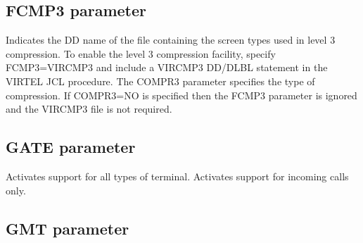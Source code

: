 \documentclass[letterpaper,10pt,english]{sphinxmanual}
\begin{document}
\ignorespaces 

\subsection{FCMP3 parameter}
\label{\detokenize{Installation_Guide:fcmp3-parameter}}\label{\detokenize{Installation_Guide:index-66}}
\begin{sphinxVerbatim}[commandchars=\\\{\}]
 
\end{sphinxVerbatim}

\sphinxAtStartPar
{} \sphinxhyphen{} Indicates the DD name of the file containing the screen types used in level 3 compression. To enable the level 3 compression facility, specify FCMP3=VIRCMP3 and include a VIRCMP3 DD/DLBL statement in the VIRTEL JCL procedure. The COMPR3 parameter specifies the type of compression. If COMPR3=NO is specified then the FCMP3 parameter is ignored and the VIRCMP3 file is not required.

\ignorespaces 

\subsection{GATE parameter}
\label{\detokenize{Installation_Guide:gate-parameter}}\label{\detokenize{Installation_Guide:index-67}}
\begin{sphinxVerbatim}[commandchars=\\\{\}]
 
\end{sphinxVerbatim}

\sphinxAtStartPar
{} \sphinxhyphen{} Activates support for all types of terminal.
 \sphinxhyphen{} Activates support for incoming calls only.

\ignorespaces 

\subsection{GMT parameter}
\label{\detokenize{Installation_Guide:gmt-parameter}}\label{\detokenize{Installation_Guide:index-68}}
\begin{sphinxVerbatim}[commandchars=\\\{\}]
 
\end{sphinxVerbatim}
\end{document}
